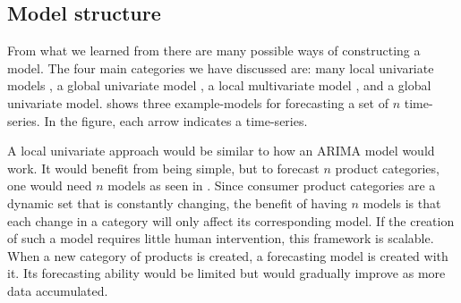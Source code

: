 \subsection{Model structure}

From what we learned from 
there are many possible ways of constructing a model.
The four main categories we have discussed are: many local univariate models ,
a global univariate model ,
a local multivariate model , and a global univariate model.
 shows three example-models for forecasting a set of $n$ time-series.
In the figure, each arrow indicates a time-series.

A local univariate approach would be similar to how an ARIMA model would work.
It would benefit from being simple, but to forecast $n$ product categories,
one would need $n$ models as seen in .
Since consumer product categories are a dynamic set that is constantly changing, the benefit of having
$n$ models is that each change in a category will only affect its corresponding model.
If the creation of such a model requires little human intervention, this framework is scalable.
When a new category of products is created, a forecasting model is created with it. Its forecasting ability
would be limited but would gradually improve as more data accumulated.

